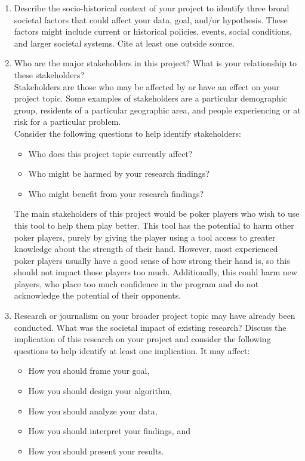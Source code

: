 \documentclass[10pt,twocolumn,letterpaper]{article}
\begin{document}
\begin{enumerate}
\item Describe the socio-historical context of your project to identify three broad societal factors that could affect your data, goal, and/or hypothesis. These factors might include current or historical policies, events, social conditions, and larger societal systems. Cite at least one outside source.
 
\item Who are the major stakeholders in this project? What is your relationship to these stakeholders? \\
Stakeholders are those who may be affected by or have an effect on your project topic. Some examples of stakeholders are a particular demographic group, residents of a particular geographic area, and people experiencing or at risk for a particular problem.\\
Consider the following questions to help identify stakeholders:
    \begin{itemize}
    \item Who does this project topic currently affect?
    \item Who might be harmed by your research findings?
    \item Who might benefit from your research findings?
    \end{itemize}
 
The main stakeholders of this project would be poker players who wish to use this tool to help them play better. This tool has the potential to harm other poker players, purely by giving the player using a tool access to greater knowledge about the strength of their hand. However, most experienced poker players usually have a good sense of how strong their hand is, so this should not impact those players too much. Additionally, this could harm new players, who place too much confidence in the program and do not acknowledge the potential of their opponents. 


\item Research or journalism on your broader project topic may have already been conducted. What was the societal impact of existing research? Discuss the implication of this research on your project and consider the following questions to help identify at least one implication. It may affect:
    \begin{itemize}
    \item How you should frame your goal,
    \item How you should design your algorithm,
    \item How you should analyze your data,
    \item How you should interpret your findings, and
    \item How you should present your results.
    \end{itemize}


\end{enumerate}
\end{document}
